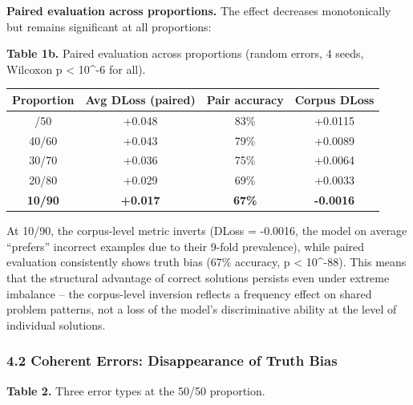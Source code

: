 \documentclass[
  11pt,
]{article}
\newcounter{none} %
\begin{document}
\textbf{Paired evaluation across proportions.} The effect decreases
monotonically but remains significant at all proportions:

\textbf{Table 1b.} Paired evaluation across proportions (random errors,
4 seeds, Wilcoxon p \textless{} 10\^{}-6 for all).

{\def\LTcaptype{none} %
\begin{longtable}[]{@{}cccc@{}}
\toprule\noalign{}
Proportion & Avg DLoss (paired) & Pair accuracy & Corpus DLoss \\
\midrule\noalign{}
\endhead
\bottomrule\noalign{}
\endlastfoot
50/50 & +0.048 & 83\% & +0.0115 \\
40/60 & +0.043 & 79\% & +0.0089 \\
30/70 & +0.036 & 75\% & +0.0064 \\
20/80 & +0.029 & 69\% & +0.0033 \\
\textbf{10/90} & \textbf{+0.017} & \textbf{67\%} & \textbf{-0.0016} \\
\end{longtable}
}

At 10/90, the corpus-level metric inverts (DLoss = -0.0016, the model on
average ``prefers'' incorrect examples due to their 9-fold prevalence),
while paired evaluation consistently shows truth bias (67\% accuracy, p
\textless{} 10\^{}-88). This means that the structural advantage of
correct solutions persists even under extreme imbalance -- the
corpus-level inversion reflects a frequency effect on shared problem
patterns, not a loss of the model's discriminative ability at the level
of individual solutions.

\subsubsection{4.2 Coherent Errors: Disappearance of Truth
Bias}\label{coherent-errors-disappearance-of-truth-bias}

\textbf{Table 2.} Three error types at the 50/50 proportion.
\end{document}
